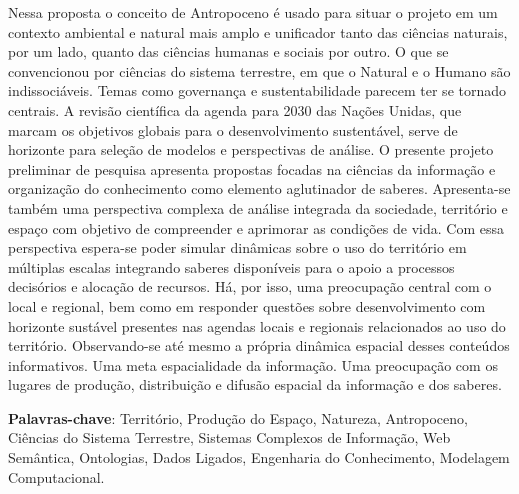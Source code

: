 \documentclass[
	12pt,				%
	openany,			%
	oneside,			%
	a4paper,			%
	english,			%
	french,				%
	spanish,			%
	brazil,				%
	]{abntex2}
\begin{document}

\frenchspacing


\imprimircapa

\imprimirfolhaderosto



\begin{resumoumacoluna}

	Nessa proposta o conceito de Antropoceno é usado para situar o projeto em um contexto ambiental e natural mais amplo e unificador tanto das ciências naturais, por um lado, quanto das ciências humanas e sociais por outro. O que se convencionou por ciências do sistema terrestre, em que o Natural e o Humano são indissociáveis. Temas como governança e sustentabilidade parecem ter se tornado centrais.
	A revisão científica da agenda para 2030 das Nações Unidas, que marcam os objetivos globais para o desenvolvimento sustentável, serve de horizonte para seleção de modelos e perspectivas de análise.
	O presente projeto preliminar de pesquisa apresenta propostas focadas na ciências da informação e organização do conhecimento como elemento aglutinador de saberes.
	Apresenta-se também uma perspectiva complexa de análise integrada da sociedade, território e espaço com objetivo de compreender e aprimorar as condições de vida. Com essa perspectiva espera-se poder simular dinâmicas sobre o uso do território em múltiplas escalas integrando saberes disponíveis para o apoio a processos decisórios e alocação de recursos.
	Há, por isso, uma preocupação central com o local e regional, bem como em responder questões sobre desenvolvimento com horizonte sustável presentes nas agendas locais e regionais relacionados ao uso do território.
	Observando-se até mesmo a própria dinâmica espacial desses conteúdos informativos. Uma meta espacialidade da informação. Uma preocupação com os lugares de produção, distribuição e difusão espacial da informação e dos saberes. %

	 \vspace{\onelineskip}

	 \noindent
	 \textbf{Palavras-chave}: Território, Produção do Espaço, Natureza, Antropoceno, Ciências do Sistema Terrestre, Sistemas Complexos de Informação, Web Semântica, Ontologias, Dados Ligados, Engenharia do Conhecimento, Modelagem Computacional.
\end{resumoumacoluna}
\end{document}
